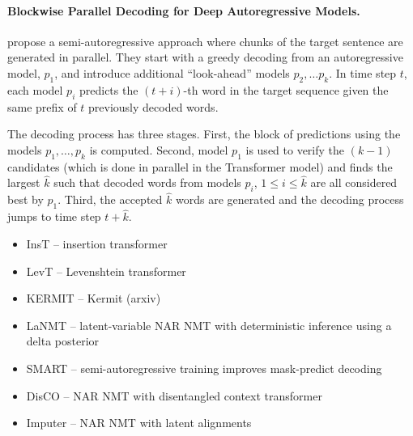 
\paragraph{Blockwise Parallel Decoding for Deep Autoregressive Models.}
\citet{stern2018blockwise} propose a semi-autoregressive approach where chunks
of the target sentence are generated in parallel.
%
They start with a greedy decoding from an autoregressive model, $p_1$, and
introduce additional ``look-ahead'' models $p_2, \ldots p_k$. In time step $t$,
each model $p_i$ predicts the $(t + i)$-th word in the target sequence given the
same prefix of $t$ previously decoded words.

The decoding process has three stages. First, the block of predictions using the
models $p_1, \ldots, p_k$ is computed. Second, model $p_1$ is used to verify the
$(k-1)$ candidates (which is done in parallel in the Transformer model) and
finds the largest $\hat{k}$ such that decoded words from models $p_i$,
$1 \leq i \leq \hat{k}$ are all considered best by $p_1$. Third, the accepted
$\hat{k}$ words are generated and the decoding process jumps to time step
$t + \hat{k}$.








\begin{itemize}
\item InsT \citep{stern2019insertion} -- insertion transformer
\item LevT \citep{gu2019levenshtein} -- Levenshtein transformer
\item KERMIT \citep{chan2019kermit} -- Kermit (arxiv)
\item LaNMT \citep{shu2020latent} -- latent-variable NAR NMT with deterministic inference using a delta posterior
\item SMART \citep{ghazvininejad2020semiautoregressive} -- semi-autoregressive training improves mask-predict decoding
\item DisCO \citep{kasai2020nonautoregressive} -- NAR NMT with disentangled context transformer
\item Imputer \citep{saharia2020nonautoregressive} -- NAR NMT with latent alignments
\end{itemize}

